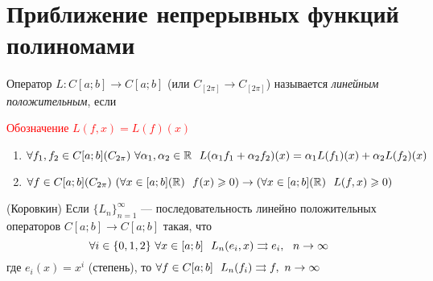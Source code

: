 \section{Приближение непрерывных функций полиномами}

\begin{definition}
	Оператор $L \colon C[a; b] \to C[a; b]$ (или $C_{[2\pi]} \to C_{[2\pi]}$) называется \textit{линейным положительным}, если
	
	\textcolor{red}{Обозначение $L(f, x) = L(f)(x)$}
	\begin{enumerate}
		\item \(\forall f_1, f_2 \in C[a; b] (C_{2\pi})\ \forall \alpha_1, \alpha_2 \in \mathbb{R}\ \ L(\alpha_1f_1 + \alpha_2f_2)(x) = \alpha_1L(f_1)(x) + \alpha_2L(f_2)(x)\)
		
		\item \(\forall f \in C[a; b] (C_{2\pi})\ (\forall x \in [a; b] (\R)\ \ f(x) \ge 0) \to (\forall x \in [a; b] (\R)\ \ L(f, x) \ge 0)\)
	\end{enumerate}
\end{definition}

\begin{theorem} (Коровкин)
	Если $\{L_n\}_{n = 1}^\infty$ --- последовательность линейно положительных операторов $C[a; b] \to C[a; b]$ такая, что
	\[
		\forall i \in \{0, 1, 2\}\ \forall x \in [a; b]\ \ L_n(e_i, x) \rra e_i,\ \ n \to \infty
	\]
	где $e_i(x) = x^i$ (степень), то $\forall f \in C[a; b]\ \ L_n(f_i) \rra f,\ n \to \infty$
\end{theorem}

